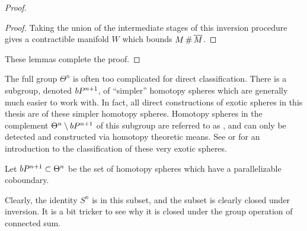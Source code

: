 \begin{proof}
\begin{proof}

		\noindent
		Taking the union of the intermediate stages of this inversion procedure gives a contractible manifold $W$ which bounds $M\+\overline{M}$.
	\end{proof}

	\noindent
	These lemmas complete the proof.
\end{proof}


The full group $\Theta^n$ is often too complicated for direct classification. There is a subgroup, denoted $bP^{n+1}$, of ``simpler'' homotopy spheres which are generally much easier to work with. In fact, all direct constructions of exotic spheres in this thesis are of these simpler homotopy spheres. Homotopy spheres in the complement $\Theta^n\setminus bP^{n+1}$ of this subgroup are referred to as , and can only be detected and constructed via homotopy theoretic means. See \cite{milnorkervaire1963groups} or \cite{levine1985lectures} for an introduction to the classification of these very exotic spheres.

\begin{definition}
	Let $bP^{n+1}\subset \Theta^n$ be the set of homotopy spheres which have a parallelizable coboundary.
\end{definition}

Clearly, the identity $S^n$ is in this subset, and the subset is clearly closed under inversion. It is a bit tricker to see why it is closed under the group operation of connected sum. 


